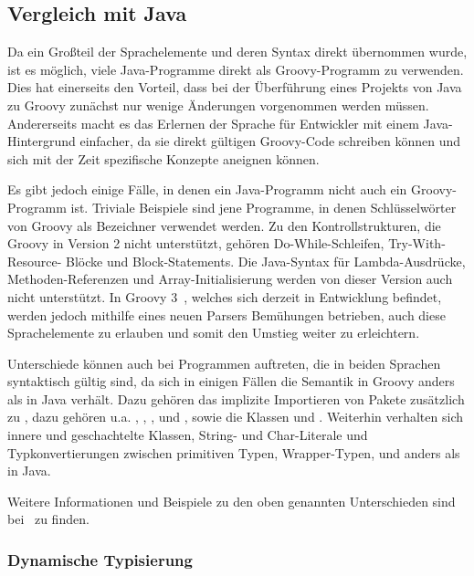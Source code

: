 	\subsection{Vergleich mit Java}\label{subsec:vergleichMitJava}

	Da ein Großteil der Sprachelemente und deren Syntax direkt übernommen wurde, ist es möglich, viele Java-Programme direkt als Groovy-Programm zu verwenden.
	Dies hat einerseits den Vorteil, dass bei der Überführung eines Projekts von Java zu Groovy zunächst nur wenige Änderungen vorgenommen werden müssen.
	Andererseits macht es das Erlernen der Sprache für Entwickler mit einem Java-Hintergrund einfacher, da sie direkt gültigen Groovy-Code schreiben können und sich mit der Zeit spezifische Konzepte aneignen können.

	Es gibt jedoch einige Fälle, in denen ein Java-Programm nicht auch ein Groovy-Programm ist.
	Triviale Beispiele sind jene Programme, in denen Schlüsselwörter von Groovy als Bezeichner verwendet werden.
	Zu den Kontrollstrukturen, die Groovy in Version 2 nicht unterstützt, gehören Do-While-Schleifen, Try-With-Resource- Blöcke und Block-Statements.
	Die Java-Syntax für Lambda-Ausdrücke, Methoden-Referenzen und Array-Initialisierung werden von dieser Version auch nicht unterstützt.
	In Groovy 3~\cite{groovy-lang:release3}, welches sich derzeit in Entwicklung befindet, werden jedoch mithilfe eines neuen Parsers Bemühungen betrieben, auch diese Sprachelemente zu erlauben und somit den Umstieg weiter zu erleichtern.

	Unterschiede können auch bei Programmen auftreten, die in beiden Sprachen syntaktisch gültig sind, da sich in einigen Fällen die Semantik in Groovy anders als in Java verhält.
	Dazu gehören das implizite Importieren von Pakete zusätzlich zu , dazu gehören {u.a.} , , ,  und , sowie die Klassen  und .
	Weiterhin verhalten sich innere und geschachtelte Klassen, String- und Char-Literale und Typkonvertierungen zwischen primitiven Typen, Wrapper-Typen,  und  anders als in Java.

	Weitere Informationen und Beispiele zu den oben genannten Unterschieden sind bei~\cite{groovy-lang:differences} zu finden.

	\subsubsection{Dynamische Typisierung}\label{subsubsec:dynamische-typisierung}


